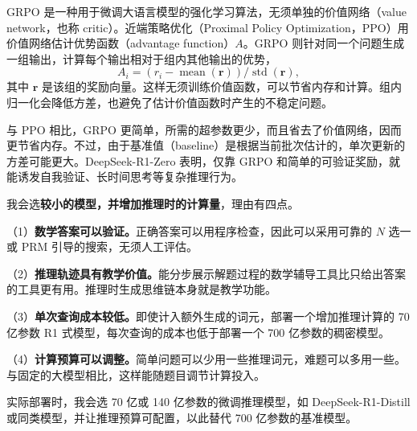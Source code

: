 \begin{interview}
GRPO 是一种用于微调大语言模型的强化学习算法，无须单独的价值网络（value network，也称 critic）。近端策略优化（Proximal Policy Optimization，PPO）用价值网络估计优势函数（advantage function）\(A\)。GRPO 则针对同一个问题生成一组输出，计算每个输出相对于组内其他输出的优势，
\[
  A_i=(r_i-\operatorname{mean}(\mathbf{r}))/\operatorname{std}(\mathbf{r}),
\]
其中 \(\mathbf{r}\) 是该组的奖励向量。这样无须训练价值函数，可以节省内存和计算。组内归一化会降低方差，也避免了估计价值函数时产生的不稳定问题。

与 PPO 相比，GRPO 更简单，所需的超参数更少，而且省去了价值网络，因而更节省内存。不过，由于基准值（baseline）是根据当前批次估计的，单次更新的方差可能更大。DeepSeek-R1-Zero 表明，仅靠 GRPO 和简单的可验证奖励，就能诱发自我验证、长时间思考等复杂推理行为。

我会选\textbf{较小的模型，并增加推理时的计算量}，理由有四点。

（1）\textbf{数学答案可以验证。}正确答案可以用程序检查，因此可以采用可靠的 \(N\) 选一或 PRM 引导的搜索，无须人工评估。

（2）\textbf{推理轨迹具有教学价值。}能分步展示解题过程的数学辅导工具比只给出答案的工具更有用。推理时生成思维链本身就是教学功能。

（3）\textbf{单次查询成本较低。}即使计入额外生成的词元，部署一个增加推理计算的 70 亿参数 R1 式模型，每次查询的成本也低于部署一个 700 亿参数的稠密模型。

（4）\textbf{计算预算可以调整。}简单问题可以少用一些推理词元，难题可以多用一些。与固定的大模型相比，这样能随题目调节计算投入。

实际部署时，我会选 70 亿或 140 亿参数的微调推理模型，如 DeepSeek-R1-Distill 或同类模型，并让推理预算可配置，以此替代 700 亿参数的基准模型。
\end{interview}

